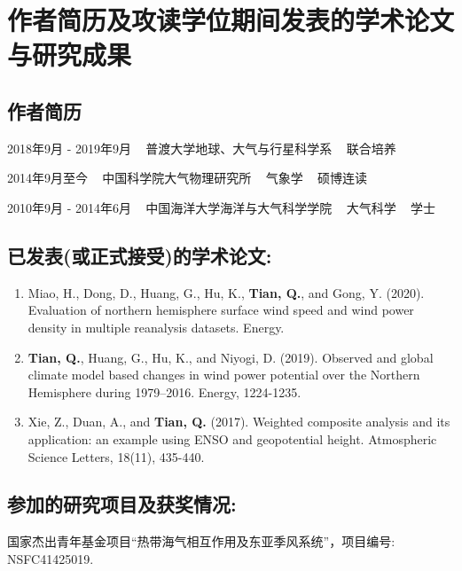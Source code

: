 \chapter{作者简历及攻读学位期间发表的学术论文与研究成果}


\section*{作者简历}

2018年9月 - 2019年9月 ~ 普渡大学地球、大气与行星科学系 ~ 联合培养

2014年9月至今 ~ 中国科学院大气物理研究所 ~ 气象学 ~ 硕博连读

2010年9月 - 2014年6月 ~ 中国海洋大学海洋与大气科学学院 ~ 大气科学 ~ 学士


\section*{已发表(或正式接受)的学术论文:}

{
\setlist[enumerate]{}%
\begin{enumerate}[nosep]
    \item Miao, H., Dong, D., Huang, G., Hu, K., \textbf{Tian, Q.}, and Gong, Y. (2020). Evaluation of northern hemisphere surface wind speed and wind power density in multiple reanalysis datasets. Energy.
    
    \item \textbf{Tian, Q.}, Huang, G., Hu, K., and Niyogi, D. (2019). Observed and global climate model based changes in wind power potential over the Northern Hemisphere during 1979–2016. Energy, 1224-1235.
    
    \item Xie, Z., Duan, A., and \textbf{Tian, Q.} (2017). Weighted composite analysis and its application: an example using ENSO and geopotential height. Atmospheric Science Letters, 18(11), 435-440.
\end{enumerate}
}


\section*{参加的研究项目及获奖情况:}

国家杰出青年基金项目“热带海气相互作用及东亚季风系统”，项目编号: NSFC41425019.

